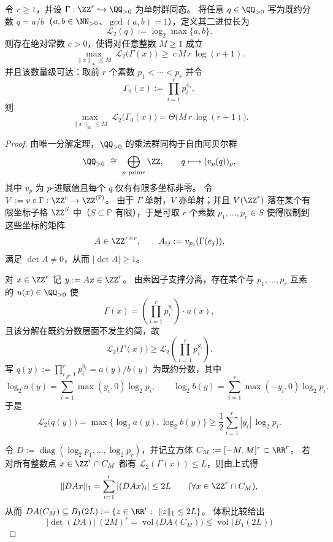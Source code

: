 \begin{theorem}\label{thm:cdim-godel-prime-bitlength-lowerbound}
令 \(r\ge 1\)，并设 \(\Gamma:\ZZ^{r}\hookrightarrow \QQ_{>0}\) 为单射群同态。
将任意 \(q\in\QQ_{>0}\) 写为既约分数 \(q=a/b\)（\(a,b\in\NN_{>0}\)、\(\gcd(a,b)=1\)），定义其二进位长为
\[
\mathcal L_2(q):=\log_2\max\{a,b\}.
\]
则存在绝对常数 \(c>0\)，使得对任意整数 \(M\ge 1\) 成立
\[
\max_{\|x\|_\infty\le M}\ \mathcal L_2\bigl(\Gamma(x)\bigr)\ \ge\ c\,M\,r\,\log(r+1).
\]
并且该数量级可达：取前 \(r\) 个素数 \(p_1<\cdots<p_r\) 并令
\[
\Gamma_0(x):=\prod_{i=1}^r p_i^{x_i},
\]
则
\[
\max_{\|x\|_\infty\le M}\ \mathcal L_2\bigl(\Gamma_0(x)\bigr)
=
\Theta\!\bigl(M\,r\,\log(r+1)\bigr).
\]
\end{theorem}
\begin{proof}
由唯一分解定理，\(\QQ_{>0}\) 的乘法群同构于自由阿贝尔群
\[
\QQ_{>0}\ \cong\ \bigoplus_{p\ \mathrm{prime}}\ZZ,\qquad
q\longmapsto (v_p(q))_{p},
\]
其中 \(v_p\) 为 \(p\)-进赋值且每个 \(q\) 仅有有限多坐标非零。
令 \(V:=v\circ\Gamma:\ZZ^r\to\ZZ^{(\mathbb P)}\)。
由于 \(\Gamma\) 单射，\(V\) 亦单射；并且 \(V(\ZZ^r)\) 落在某个有限坐标子格 \(\ZZ^{S}\) 中（\(S\subset\mathbb P\) 有限），于是可取 \(r\) 个素数 \(p_1,\dots,p_r\in S\) 使得限制到这些坐标的矩阵
\[
A\in\ZZ^{r\times r},\qquad A_{ij}:=v_{p_i}(\Gamma(e_j)),
\]
满足 \(\det A\neq 0\)，从而 \(|\det A|\ge 1\)。
\par
对 \(x\in\ZZ^r\) 记 \(y:=Ax\in\ZZ^r\)。
由素因子支撑分离，存在某个与 \(p_1,\dots,p_r\) 互素的 \(u(x)\in\QQ_{>0}\) 使
\[
\Gamma(x)=\left(\prod_{i=1}^r p_i^{y_i}\right)\cdot u(x),
\]
且该分解在既约分数层面不发生约简，故
\[
\mathcal L_2\bigl(\Gamma(x)\bigr)
\ge
\mathcal L_2\!\left(\prod_{i=1}^r p_i^{y_i}\right).
\]
写 \(q(y):=\prod_{i=1}^r p_i^{y_i}=a(y)/b(y)\) 为既约分数，其中
\[
\log_2 a(y)=\sum_{i=1}^r \max(y_i,0)\log_2 p_i,\qquad
\log_2 b(y)=\sum_{i=1}^r \max(-y_i,0)\log_2 p_i.
\]
于是
\[
\mathcal L_2\bigl(q(y)\bigr)
=\max\{\log_2 a(y),\log_2 b(y)\}
\ge
\frac12\sum_{i=1}^r |y_i|\,\log_2 p_i.
\]
\par
令 \(D:=\operatorname{diag}(\log_2 p_1,\dots,\log_2 p_r)\)，并记立方体 \(C_M:=[-M,M]^r\subset\RR^r\)。
若对所有整数点 \(x\in\ZZ^r\cap C_M\) 都有 \(\mathcal L_2(\Gamma(x))\le L\)，则由上式得
\[
\|DAx\|_1=\sum_{i=1}^r |(DAx)_i|\le 2L
\qquad(\forall x\in \ZZ^r\cap C_M),
\]
从而 \(DA(C_M)\subseteq B_1(2L):=\{z\in\RR^r:\ \|z\|_1\le 2L\}\)。
体积比较给出
\[
|\det(DA)|\,(2M)^r
=
\operatorname{vol}\bigl(DA(C_M)\bigr)
\le
\operatorname{vol}\bigl(B_1(2L)\bigr)
\]
\end{proof}
